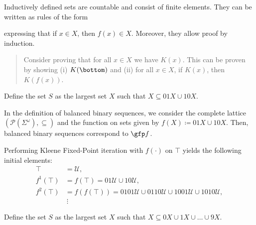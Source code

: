 \begin{remark}
    Inductively defined sets are countable and consist of finite elements.
    They can be written as rules of the form
\begin{prooftree}
\end{prooftree}
    expressing that if $x \in X$, then $f(x) \in X$. Moreover, they allow proof by induction. 
    \begin{quote}
         Consider proving that for all $x \in X$ we have $K(x)$. This can be proven by showing (i) $K(\bottom)$ and (ii) for all $x \in X$, if $K(x)$, then $K(f(x))$.
    \end{quote}
\end{remark}

\begin{definition}
    Define the set $S$ as the largest set $X$ such that $X \subseteq 01X \cup 10X$.
\end{definition}


\begin{remark}
    In the definition of balanced binary sequences, we consider the complete lattice $(\mathcal{P}(\Sigma^\omega), \subseteq)$ and the function on sets given by $f(X) \coloneqq 01X \cup 10X$. Then, balanced binary sequences correspond to $\gfp f$.	
    
    Performing Kleene Fixed-Point iteration with $f(\cdot)$ on $\top$ yields the following initial elements:
    \begin{align*}
        \top &= \mathcal{U}, \\
        f^1(\top) &= f(\top) = 01\mathcal{U} \cup 10\mathcal{U}, \\
        f^2(\top) &= f(f(\top)) = 0101\mathcal{U} \cup 0110\mathcal{U} \cup 1001\mathcal{U} \cup 1010\mathcal{U}, \\
        &\ \vdots
    \end{align*}
\end{remark}


\begin{definition}[Interval {$[0, 1]$}]
    Define the set $S$ as the largest set $X$ such that $X \subseteq 0X \cup 1X \cup \ldots \cup 9X$.
\end{definition}


